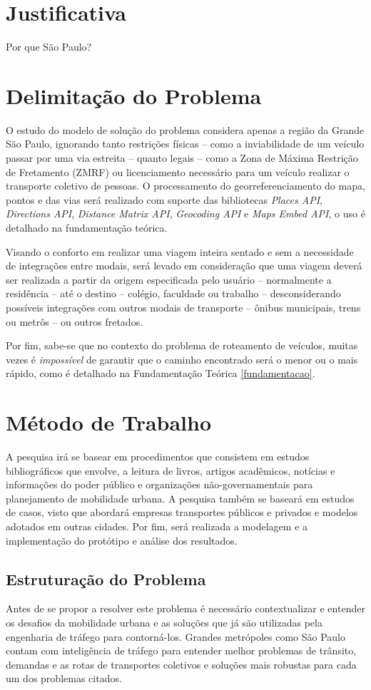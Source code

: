 \section{Justificativa}
Por que São Paulo?

\section{Delimitação do Problema}
O estudo do modelo de solução do problema considera apenas a região da Grande São Paulo, ignorando tanto restrições físicas -- como a inviabilidade de um veículo passar por uma via estreita -- quanto legais -- como a Zona de Máxima Restrição de Fretamento (ZMRF) ou licenciamento necessário para um veículo realizar o transporte coletivo de pessoas. O processamento do georreferenciamento do mapa, pontos e das vias será realizado com suporte das bibliotecas \emph{Places API}, \emph{Directions API}, \emph{Distance Matrix API}, \emph{Geocoding API} e \emph{Maps Embed API}, o uso é detalhado na fundamentação teórica.

Visando o conforto em realizar uma viagem inteira sentado e sem a necessidade de integrações entre modais, será levado em consideração que uma viagem deverá ser realizada a partir da origem especificada pelo usuário -- normalmente a residência -- até o destino -- colégio, faculdade ou trabalho -- desconsiderando possíveis integrações com outros modais de transporte -- ônibus municipais, trens ou metrôs -- ou outros fretados.

Por fim, sabe-se que no contexto do problema de roteamento de veículos, muitas vezes é \emph{impossível} de garantir que o caminho encontrado será o menor ou o mais rápido, como é detalhado na Fundamentação Teórica \ref{fundamentacao}.

\section{Método de Trabalho}\label{metodo-trabalho}
A pesquisa irá se basear em procedimentos que consistem em estudos bibliográficos que envolve, a leitura de livros, artigos acadêmicos, notícias e informações do poder público e organizações não-governamentais para planejamento de mobilidade urbana. A pesquisa também se baseará em estudos de casos, visto que abordará empresas transportes públicos e privados e modelos adotados em outras cidades. Por fim, será realizada a modelagem e a implementação do protótipo e análise dos resultados.

\subsection{Estruturação do Problema}
Antes de se propor a resolver este problema é necessário contextualizar e entender os desafios da mobilidade urbana e as soluções que já são utilizadas pela engenharia de tráfego para contorná-los. Grandes metrópoles como São Paulo contam com inteligência de tráfego para entender melhor problemas de trânsito, demandas e as rotas de transportes coletivos e soluções mais robustas para cada um dos problemas citados.

